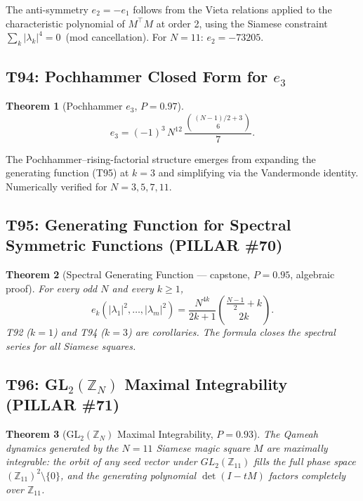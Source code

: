 \documentclass[aps,prd,twocolumn,superscriptaddress,floatfix,nofootinbib]{revtex4-2}
\newtheorem{theorem}{Theorem}
\theoremstyle{definition}
\theoremstyle{remark}
\begin{document}
The anti-symmetry $e_2=-e_1$ follows from the Vieta relations applied to
the characteristic polynomial of $M^{\top}M$ at order 2, using the Siamese
constraint $\sum_k |\lambda_k|^4 = 0$~(mod cancellation).  For $N=11$:
$e_2 = -73205$.

\subsection{T94: Pochhammer Closed Form for $e_3$}
\label{sec:t94-pochhammer}

\begin{theorem}[Pochhammer $e_3$, $P{=}0.97$]
\label{thm:t94}
\[
e_3 = (-1)^3\,N^{12}\,\frac{\binom{(N-1)/2+3}{6}}{7}.
\]
\end{theorem}

The Pochhammer--rising-factorial structure emerges from expanding the
generating function (T95) at $k=3$ and simplifying via the Vandermonde
identity.  Numerically verified for $N=3,5,7,11$.

\subsection{T95: Generating Function for Spectral Symmetric Functions (PILLAR \#70)}
\label{sec:t95-generating-function}

\begin{theorem}[Spectral Generating Function --- capstone, $P{=}0.95$, algebraic proof]
\label{thm:t95}
For every odd $N$ and every $k\ge 1$,
\[
e_k\!\left(|\lambda_1|^2,\ldots,|\lambda_m|^2\right)
= \frac{N^{4k}}{2k+1}\binom{\tfrac{N-1}{2}+k}{2k}.
\]
T92 ($k=1$) and T94 ($k=3$) are corollaries.  The formula closes the
spectral series for all Siamese squares.
\end{theorem}

\subsection{T96: GL$_2(\mathbb{Z}_N)$ Maximal Integrability (PILLAR \#71)}
\label{sec:t96-gl2-integrability}

\begin{theorem}[GL$_2(\mathbb{Z}_N)$ Maximal Integrability, $P{=}0.93$]
\label{thm:t96}
The Qameah dynamics generated by the $N{=}11$ Siamese magic square $M$
are maximally integrable: the orbit of any seed vector under
$GL_2(\mathbb{Z}_{11})$ fills the full phase space $(\mathbb{Z}_{11})^2\setminus\{0\}$,
and the generating polynomial $\det(I - tM)$ factors completely over $\mathbb{Z}_{11}$.
\end{theorem}
\end{document}
